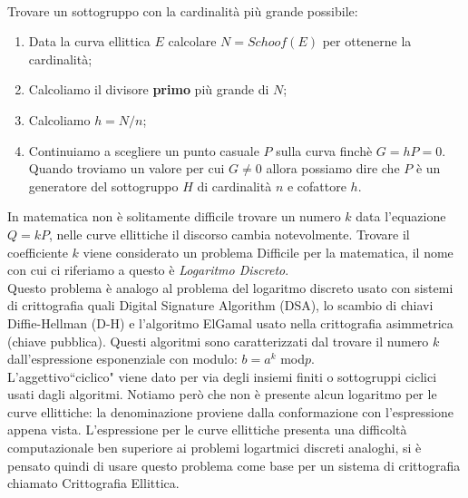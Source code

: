 \documentclass[a4paper,12pt]{tesiinfo}
\begin{document}
\\
Trovare un sottogruppo con la cardinalit\`a pi\`u grande possibile:
\begin{enumerate}
  \item Data la curva ellittica $E$ calcolare $N = Schoof(E)$ per ottenerne la cardinalit\`a;
  \item Calcoliamo il divisore \textbf{primo} pi\`u grande di $N$;
  \item Calcoliamo $h = N \big / n$;
  \item Continuiamo a scegliere un punto casuale $P$ sulla curva finch\`e $G = hP = 0$. Quando troviamo un valore per cui $G \ne 0$ allora possiamo dire che $P$ \`e un generatore del sottogruppo $H$ di cardinalit\`a $n$ e cofattore $h$.
\end{enumerate}
In matematica non \`e solitamente difficile trovare un numero $k$ data l'equazione $Q = kP$, nelle curve ellittiche il discorso cambia notevolmente. Trovare il coefficiente $k$ viene considerato un problema Difficile per la matematica, il nome con cui ci riferiamo a questo \`e \textit{Logaritmo Discreto}.
\\
Questo problema \`e analogo al problema del logaritmo discreto usato con sistemi di crittografia quali Digital Signature Algorithm (DSA), lo scambio di chiavi Diffie-Hellman (D-H) e l'algoritmo ElGamal usato nella crittografia asimmetrica (chiave pubblica). Questi algoritmi sono caratterizzati dal trovare il numero $k$ dall'espressione esponenziale con modulo: $b = a^k$ mod$p$. 
\\
L'aggettivo``ciclico" viene dato per via degli insiemi finiti o sottogruppi ciclici usati dagli algoritmi. Notiamo per\`o che non \`e presente alcun logaritmo per le curve ellittiche: la denominazione proviene dalla conformazione con l'espressione appena vista. L'espressione per le curve ellittiche presenta una difficolt\`a computazionale ben superiore ai problemi logartmici discreti analoghi, si \`e pensato quindi di usare questo problema come base per un sistema di crittografia chiamato Crittografia Ellittica.
%
%
%
%
%
\end{document}
